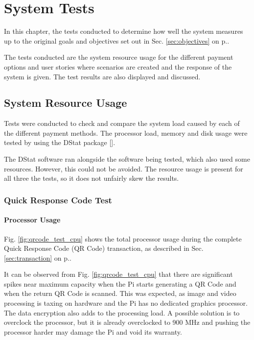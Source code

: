 \chapter{System Tests}
\label{chap:6}

In this chapter, the tests  conducted to determine how well the system measures
up to the original goals and objectives set out in Sec. \ref{sec:objectives} on
p.\pageref{sec:objectives}.

The tests conducted are the system resource usage for the different payment
options and user stories where scenarios are created and the response of the
system is given. The test results are also displayed and discussed. 

\section{System Resource Usage}

Tests were conducted to check and compare the system load caused by each of the
different payment methods. The processor load, memory and disk usage were tested
by using the DStat package [\cite{website:dstat}].

The DStat software ran alongside the software being tested, which also used
some resources. However, this could not be avoided. The resource usage is
present for all three the tests, so it does not unfairly skew the results.

\subsection{Quick Response Code Test}
\label{sec:qr-tests}

\subsubsection{Processor Usage}

Fig. \ref{fig:qrcode_test_cpu} shows the total processor usage during the complete
Quick Response Code (QR Code) transaction, as described in Sec.
\ref{sec:transaction} on p.\pageref{sec:transaction}.

It can be observed from Fig. \ref{fig:qrcode_test_cpu} that there are significant spikes
near maximum capacity when the Pi starts generating a QR Code and when the return QR Code is scanned. This was expected, as
image and video processing is taxing on hardware and the Pi has no dedicated graphics
processor. The data encryption also adds to the processing load. A possible solution is to
overclock the processor, but it is already overclocked to 900 MHz and pushing the
processor harder may damage the Pi and void its warranty.

